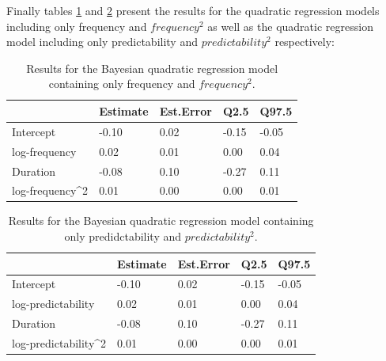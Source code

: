 \documentclass[
  man,floatsintext]{apa6}
\begin{document}
Finally tables \ref{tab:brmsFreq} and \ref{tab:brmsPredic} present the results for the quadratic regression models including only frequency and \(frequency^2\) as well as the quadratic regression model including only predictability and \(predictability^2\) respectively:



\begin{table}[H]

\begin{center}
\begin{threeparttable}

\caption{\label{tab:brmsFreq}Results for the Bayesian quadratic regression model containing only frequency and \(frequency^2\).}

\begin{tabular}{lllll}
\toprule
 & \multicolumn{1}{c}{Estimate} & \multicolumn{1}{c}{Est.Error} & \multicolumn{1}{c}{Q2.5} & \multicolumn{1}{c}{Q97.5}\\
\midrule
Intercept & -0.10 & 0.02 & -0.15 & -0.05\\
log-frequency & 0.02 & 0.01 & 0.00 & 0.04\\
Duration & -0.08 & 0.10 & -0.27 & 0.11\\
log-frequency\textasciicircum{}2 & 0.01 & 0.00 & 0.00 & 0.01\\
\bottomrule
\end{tabular}

\end{threeparttable}
\end{center}

\end{table}



\begin{table}[H]

\begin{center}
\begin{threeparttable}

\caption{\label{tab:brmsPredic}Results for the Bayesian quadratic regression model containing only predidctability and \(predictability^2\).}

\begin{tabular}{lllll}
\toprule
 & \multicolumn{1}{c}{Estimate} & \multicolumn{1}{c}{Est.Error} & \multicolumn{1}{c}{Q2.5} & \multicolumn{1}{c}{Q97.5}\\
\midrule
Intercept & -0.10 & 0.02 & -0.15 & -0.05\\
log-predictability & 0.02 & 0.01 & 0.00 & 0.04\\
Duration & -0.08 & 0.10 & -0.27 & 0.11\\
log-predictability\textasciicircum{}2 & 0.01 & 0.00 & 0.00 & 0.01\\
\bottomrule
\end{tabular}

\end{threeparttable}
\end{center}

\end{table}
\end{document}
